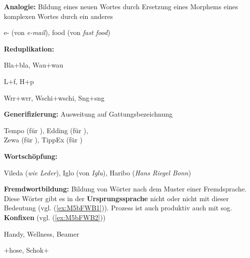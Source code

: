 \begin{frame}



\textbf{Analogie:} Bildung eines neuen Wortes durch Ersetzung eines Morphems eines komplexen Wortes durch ein anderes

\ea e- (von \emph{e-mail}),  food (von \emph{fast food})
\z


\medskip
\pause 


\textbf{Reduplikation:}

\settowidth{} 
\ea Bla$+$bla, Wau$+$wau 

\ex L$+$f, H$+$p \jambox{[Reimdopplung]}

\ex Wrr$+$wrr, Wschi$+$wschi, Sng$+$sng  \jambox{[Ablautdopplung]}
\z

\end{frame}


\begin{frame}


\textbf{Generifizierung:} Ausweitung auf Gattungsbezeichnung

\ea Tempo (für ), Edding (für ),\\Zewa (für ), TippEx (für )
\z


\medskip
\pause 


\textbf{Wortschöpfung:}

\ea Vileda (\emph{wie Leder}), Iglo (von \emph{Iglu}), Haribo (\emph{Hans Riegel Bonn})
\z


\medskip
\pause 


\textbf{Fremdwortbildung:} Bildung von Wörter nach dem Muster einer Fremdsprache. Diese Wörter gibt es in der \textbf{Ursprungssprache} nicht oder nicht mit dieser Bedeutung (vgl. (\ref{ex:M5bFWB1})). Prozess ist auch produktiv auch mit sog. \textbf{Konfixen} (vgl. (\ref{ex:M5bFWB2}))

\ea\label{ex:M5bFWB1} Handy, Wellness, Beamer

\ex\label{ex:M5bFWB2} $+$hose, Schok$+$
\z

\end{frame}



